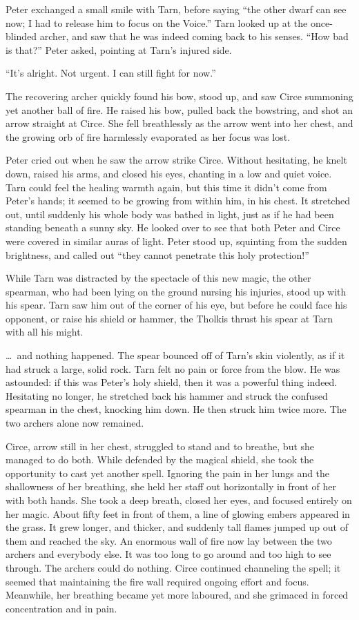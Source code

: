 Peter exchanged a small smile with Tarn, before saying ``the other dwarf can see now; I had to release him to focus on the Voice.''  Tarn looked up at the once-blinded archer, and saw that he was indeed coming back to his senses.  ``How bad is that?'' Peter asked, pointing at Tarn's injured side.

``It's alright.  Not urgent.  I can still fight for now.''

The recovering archer quickly found his bow, stood up, and saw Circe summoning yet another ball of fire.  He raised his bow, pulled back the bowstring, and shot an arrow straight at Circe.  She fell breathlessly as the arrow went into her chest, and the growing orb of fire harmlessly evaporated as her focus was lost.

Peter cried out when he saw the arrow strike Circe.  Without hesitating, he knelt down, raised his arms, and closed his eyes, chanting in a low and quiet voice.  Tarn could feel the healing warmth again, but this time it didn't come from Peter's hands; it seemed to be growing from within him, in his chest.  It stretched out, until suddenly his whole body was bathed in light, just as if he had been standing beneath a sunny sky.  He looked over to see that both Peter and Circe were covered in similar auras of light.  Peter stood up, squinting from the sudden brightness, and called out ``they cannot penetrate this holy protection!''

While Tarn was distracted by the spectacle of this new magic, the other spearman, who had been lying on the ground nursing his injuries, stood up with his spear.  Tarn saw him out of the corner of his eye, but before he could face his opponent, or raise his shield or hammer, the Tholkis thrust his spear at Tarn with all his might.

\ldots\ and nothing happened.  The spear bounced off of Tarn's skin violently, as if it had struck a large, solid rock.  Tarn felt no pain or force from the blow.  He was astounded: if this was Peter's holy shield, then it was a powerful thing indeed.  Hesitating no longer, he stretched back his hammer and struck the confused spearman in the chest, knocking him down.  He then struck him twice more.  The two archers alone now remained.

Circe, arrow still in her chest, struggled to stand and to breathe, but she managed to do both.  While defended by the magical shield, she took the opportunity to cast yet another spell.  Ignoring the pain in her lungs and the shallowness of her breathing, she held her staff out horizontally in front of her with both hands.  She took a deep breath, closed her eyes, and focused entirely on her magic.  About fifty feet in front of them, a line of glowing embers appeared in the grass.  It grew longer, and thicker, and suddenly tall flames jumped up out of them and reached the sky.  An enormous wall of fire now lay between the two archers and everybody else.  It was too long to go around and too high to see through.  The archers could do nothing.  Circe continued channeling the spell; it seemed that maintaining the fire wall required ongoing effort and focus.  Meanwhile, her breathing became yet more laboured, and she grimaced in forced concentration and in pain.


